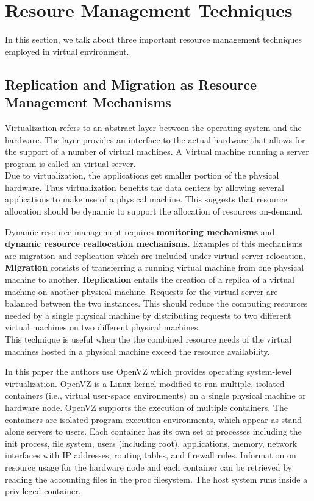 \documentclass[12pt]{article} %
\begin{document}
\section{Resoure Management Techniques}
In this section, we talk about three important resource management techniques employed in virtual environment.
\subsection{Replication and Migration as Resource Management Mechanisms}
Virtualization refers to an abstract layer between the operating system and the hardware. The layer provides an interface to the actual hardware that allows for the support of a number of virtual machines. A Virtual machine running a server program is called an virtual server.\\



Due to virtualization, the applications get smaller portion of the physical hardware. Thus virtualization benefits the data centers by allowing several applications to make use of a physical machine. This suggests that resource allocation should be dynamic to
support the allocation of resources on-demand.


Dynamic resource management requires \textbf{monitoring mechanisms} and \textbf{dynamic resource reallocation mechanisms}. Examples of this mechanisms are migration and replication which are included under virtual server relocation. \textbf{Migration} consists of transferring a running virtual machine from one physical machine to another. \textbf{Replication} entails the creation of a replica of a virtual machine on another physical machine. Requests for the virtual server are balanced between the two instances. This should reduce the computing resources needed by a single physical machine by distributing requests to two different virtual machines on two different physical machines.\\
This technique is useful when the the combined resource needs of the virtual machines hosted in a physical machine exceed the resource availability.



In this paper the authors use OpenVZ which provides operating
system-level virtualization. OpenVZ is a Linux kernel modified to run multiple, isolated containers (i.e., virtual user-space environments) on a single physical  machine or hardware node. OpenVZ supports the execution of multiple containers. The containers are isolated program execution environments, which appear as stand-alone servers to users. Each container has its own set of processes including the init process, file system, users (including root), applications, memory, network interfaces with IP addresses, routing tables, and firewall rules. Information on resource usage for the hardware node and each container can be retrieved by reading the accounting files in the proc filesystem. The host system runs inside a privileged container.
\end{document}
